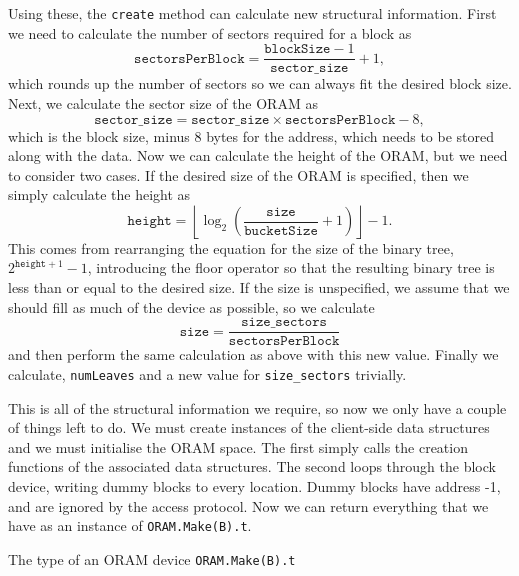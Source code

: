 \documentclass[12pt,a4paper,twoside,openright]{report}
\begin{document}
Using these, the \texttt{create} method can calculate new structural information. First we need to calculate the number of sectors required for a block as $$\mathtt{sectorsPerBlock} = \frac{\mathtt{blockSize} - 1}{\mathtt{sector\_size}} + 1,$$ which rounds up the number of sectors so we can always fit the desired block size. Next, we calculate the sector size of the ORAM as $$\mathtt{sector\_size} = \mathtt{sector\_size} \times \mathtt{sectorsPerBlock} - 8,$$ which is the block size, minus 8 bytes for the address, which needs to be stored along with the data. Now we can calculate the height of the ORAM, but we need to consider two cases. If the desired size of the ORAM is specified, then we simply calculate the height as $$\mathtt{height} = \left\lfloor \log_2\left(\frac{\mathtt{size}}{\mathtt{bucketSize}} + 1\right)\right\rfloor - 1.$$ This comes from rearranging the equation for the size of the binary tree, $2^{\mathtt{height} + 1} - 1$, introducing the floor operator so that the resulting binary tree is less than or equal to the desired size. If the size is unspecified, we assume that we should fill as much of the device as possible, so we calculate $$\mathtt{size} = \frac{\mathtt{size\_sectors}}{\mathtt{sectorsPerBlock}}$$ and then perform the same calculation as above with this new value. Finally we calculate, \texttt{numLeaves} and a new value for \texttt{size\_sectors} trivially.

This is all of the structural information we require, so now we only have a couple of things left to do. We must create instances of the client-side data structures and we must initialise the ORAM space. The first simply calls the creation functions of the associated data structures. The second loops through the block device, writing dummy blocks to every location. Dummy blocks have address -1, and are ignored by the access protocol. Now we can return everything that we have as an instance of \texttt{ORAM.Make(B).t}.

\begin{listing}[H]
\caption{The type of an ORAM device \texttt{ORAM.Make(B).t}}
\label{lst:orammaketype}
\inputminted[firstline=27, lastline=39]{ocaml}{../src/oram.ml}
\end{listing}
\end{document}
